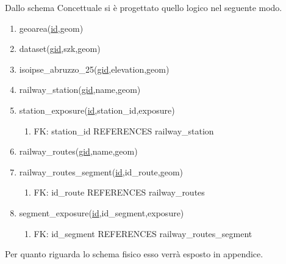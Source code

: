 Dallo schema Concettuale si è progettato quello logico nel seguente modo.

\begin{enumerate}
	\item geoarea(\underline{id},geom)
	\item dataset(\underline{gid},szk,geom) 
	\item isoipse\_abruzzo\_25(\underline{gid},elevation,geom)
	\item railway\_station(\underline{gid},name,geom)
	\item station\_exposure(\underline{id},station\_id,exposure)
	\begin{enumerate}
		\item FK: station\_id REFERENCES railway\_station  
	\end{enumerate}
	\item railway\_routes(\underline{gid},name,geom)
	\item railway\_routes\_segment(\underline{id},id\_route,geom)
	\begin{enumerate}
		\item FK: id\_route REFERENCES railway\_routes
	\end{enumerate}
	\item segment\_exposure(\underline{id},id\_segment,exposure)
	\begin{enumerate}
		\item FK: id\_segment REFERENCES railway\_routes\_segment
	\end{enumerate}
\end{enumerate}

Per quanto riguarda lo schema fisico esso verrà esposto in appendice.
